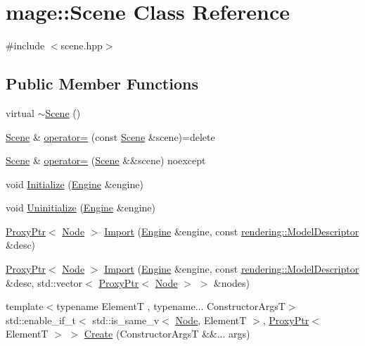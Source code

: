\hypertarget{classmage_1_1_scene}{}\section{mage\+:\+:Scene Class Reference}
\label{classmage_1_1_scene}


{\ttfamily \#include $<$scene.\+hpp$>$}

\subsection*{Public Member Functions}
\begin{DoxyCompactItemize}
\item 
virtual \hyperlink{classmage_1_1_scene_adc40910fdca62586659c2961fe7e7f3c}{$\sim$\+Scene} ()
\item 
\hyperlink{classmage_1_1_scene}{Scene} \& \hyperlink{classmage_1_1_scene_a2c25c0fedc0230771d8c00a8288a69ce}{operator=} (const \hyperlink{classmage_1_1_scene}{Scene} \&scene)=delete
\item 
\hyperlink{classmage_1_1_scene}{Scene} \& \hyperlink{classmage_1_1_scene_a0256a5b54db093088f40511cf61eb277}{operator=} (\hyperlink{classmage_1_1_scene}{Scene} \&\&scene) noexcept
\item 
void \hyperlink{classmage_1_1_scene_a0edb77d5e45bd1822793d189a45fbb5c}{Initialize} (\hyperlink{classmage_1_1_engine}{Engine} \&engine)
\item 
void \hyperlink{classmage_1_1_scene_a3fd909919f832b122bb3cd205c9beb2c}{Uninitialize} (\hyperlink{classmage_1_1_engine}{Engine} \&engine)
\item 
\hyperlink{classmage_1_1_proxy_ptr}{Proxy\+Ptr}$<$ \hyperlink{classmage_1_1_node}{Node} $>$ \hyperlink{classmage_1_1_scene_a03490fe422fdfa110a6d3b58c31d1bb4}{Import} (\hyperlink{classmage_1_1_engine}{Engine} \&engine, const \hyperlink{classmage_1_1rendering_1_1_model_descriptor}{rendering\+::\+Model\+Descriptor} \&desc)
\item 
\hyperlink{classmage_1_1_proxy_ptr}{Proxy\+Ptr}$<$ \hyperlink{classmage_1_1_node}{Node} $>$ \hyperlink{classmage_1_1_scene_ac3ac7fd6eb1e6f59626b65f3da8553a4}{Import} (\hyperlink{classmage_1_1_engine}{Engine} \&engine, const \hyperlink{classmage_1_1rendering_1_1_model_descriptor}{rendering\+::\+Model\+Descriptor} \&desc, std\+::vector$<$ \hyperlink{classmage_1_1_proxy_ptr}{Proxy\+Ptr}$<$ \hyperlink{classmage_1_1_node}{Node} $>$ $>$ \&nodes)
\item 
{\footnotesize template$<$typename ElementT , typename... Constructor\+ArgsT$>$ }\\std\+::enable\+\_\+if\+\_\+t$<$ std\+::is\+\_\+same\+\_\+v$<$ \hyperlink{classmage_1_1_node}{Node}, ElementT $>$, \hyperlink{classmage_1_1_proxy_ptr}{Proxy\+Ptr}$<$ ElementT $>$ $>$ \hyperlink{classmage_1_1_scene_a8ce3f5152ad4b0935a08cc2f0a53383c}{Create} (Constructor\+ArgsT \&\&... args)

\end{DoxyCompactItemize}
